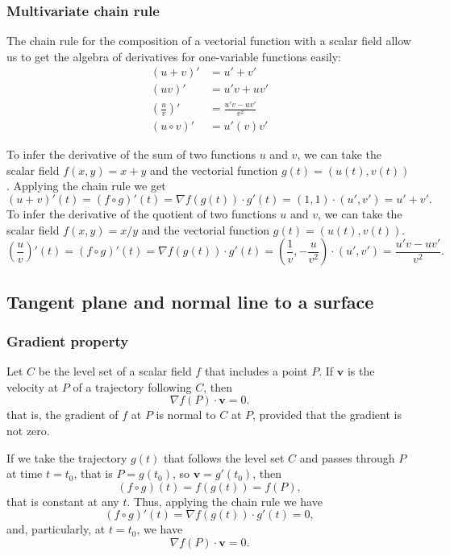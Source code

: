 \begin{frame}
\frametitle{Multivariate chain rule}
The chain rule for the composition of a vectorial function with a scalar field allow us to get the algebra of derivatives for one-variable functions easily:
\begin{align*}
(u+v)' &= u'+v'\\
(uv)' &= u'v+uv'\\
\left(\frac{u}{v}\right)' &= \frac{u'v-uv'}{v^2}\\
(u\circ v)' &= u'(v)v'
\end{align*}

To infer the derivative of the sum of two functions $u$ and $v$, we can take the scalar field $f(x,y)=x+y$ and the vectorial function $g(t)=(u(t),v(t))$.
Applying the chain rule we get
\[
(u+v)'(t) = (f\circ g)'(t) = \nabla f(g(t))\cdot g'(t) = (1,1)\cdot (u',v') = u'+v'.
\]
To infer the derivative of the quotient of two functions $u$ and $v$, we can take the scalar field $f(x,y)=x/y$ and the vectorial function $g(t)=(u(t),v(t))$.
\[
\left(\frac{u}{v}\right)'(t) = (f\circ g)'(t) = \nabla f(g(t))\cdot g'(t) = \left(\frac{1}{v},-\frac{u}{v^2}\right)\cdot (u',v') = \frac{u'v-uv'}{v^2}.
\]
\end{frame}



\subsection{Tangent plane and normal line to a surface}
\begin{frame}
\frametitle{Gradient property}
\begin{theorem}
Let $C$ be the level set of a scalar field $f$ that includes a point $P$.
If $\mathbf{v}$ is the velocity at $P$ of a trajectory following $C$, then
\[
\nabla f(P) \cdot \mathbf{v} = 0.
\]
that is, the gradient of $f$ at $P$ is normal to $C$ at $P$, provided that the gradient is not zero.
\end{theorem}

If we take the trajectory $g(t)$ that follows the level set $C$ and passes through $P$ at time $t=t_0$, that is $P=g(t_0)$, so $\mathbf{v}=g'(t_0)$, then
\[
(f\circ g)(t) = f(g(t)) = f(P),
\]
that is constant at any $t$.
Thus, applying the chain rule we have
\[
(f\circ g)'(t) = \nabla f(g(t))\cdot  g'(t) = 0,
\]
and, particularly, at $t=t_0$, we have
\[
\nabla f(P)\cdot \mathbf{v} = 0.
\]
\end{frame}


